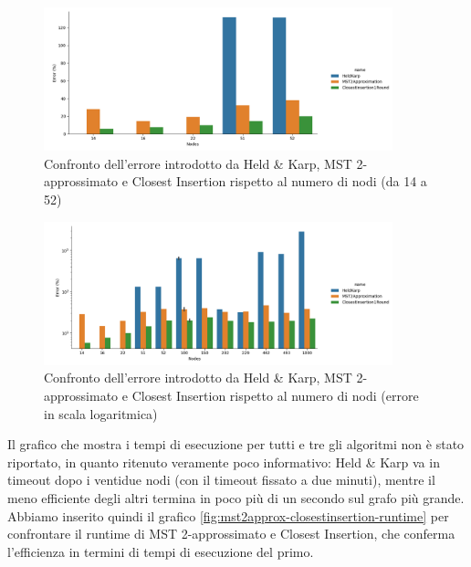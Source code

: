\begin{figure}[H]
    \centering

    \includegraphics[width=0.9\textwidth]{./images/HeldKarp_vs_MST2Approximation_vs_ClosestInsertion1Round__approximation_error__limited_to_52_nodes_.png}

    \caption{Confronto dell'errore introdotto da Held \& Karp, MST 2-approssimato e Closest Insertion rispetto al numero di nodi (da 14 a 52)}
    \label{fig:heldkarp-mst2approx-closestinsertion-accuracy-error-52-nodes}
\end{figure}

\begin{figure}[H]
    \centering

    \includegraphics[width=0.9\textwidth]{./images/HeldKarp_vs_MST2Approximation_vs_ClosestInsertion1Round__approximation_error__y_log_scaled_.png}

    \caption{Confronto dell'errore introdotto da Held \& Karp, MST 2-approssimato e Closest Insertion rispetto al numero di nodi (errore in scala logaritmica)}
    \label{fig:heldkarp-mst2approx-closestinsertion-accuracy-error}
\end{figure}

\noindent Il grafico che mostra i tempi di esecuzione per tutti e tre
gli algoritmi non è stato riportato, in quanto ritenuto veramente poco
informativo: Held \& Karp va in timeout dopo i ventidue nodi (con il
timeout fissato a due minuti), mentre il meno efficiente degli altri
termina in poco più di un secondo sul grafo più grande. Abbiamo
inserito quindi il grafico
\ref{fig:mst2approx-closestinsertion-runtime} per confrontare il
runtime di MST 2-approssimato e Closest Insertion, che conferma
l'efficienza in termini di tempi di esecuzione del primo.


